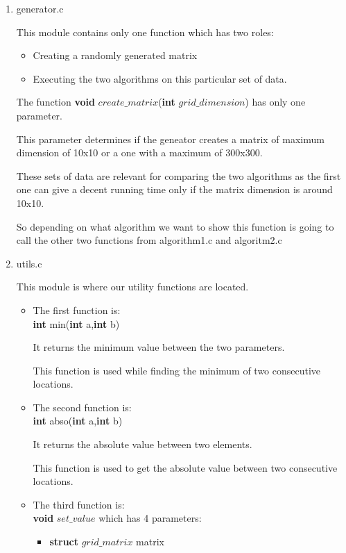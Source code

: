 \documentclass{article}
\begin{document}
\begin{enumerate}
\begin{itemize}
  \end{itemize}
  \newpage
  \item generator.c
  \par This module contains only one function which has two roles:
  \begin{itemize}
      \item Creating a randomly generated matrix
      \item Executing the two algorithms on this particular set of data.
  \end{itemize}
  \par The function \textbf{void} $create\_matrix$(\textbf{int} $grid\_dimension$) has only one parameter. 
  \par This parameter determines if the geneator creates a matrix of maximum dimension of 10x10 or a one with a maximum of 300x300.
  \par These sets of data are relevant for comparing the two algorithms
  as the first one can give a decent running time only if the matrix dimension is around 10x10.
  \par So depending on what algorithm we want to show this function is going to call the other two functions from algorithm1.c and algoritm2.c
  \item utils.c
  \par This module is where our utility functions are located.
  \begin{itemize}
      \item The first function is:
      \\\textbf{int} min(\textbf {int} a,\textbf{int} b)
      \par It returns the minimum value between the two parameters.
      \par This function is used while finding the minimum of two consecutive locations.
      \newpage
      \item The second function is:
      \\\textbf{int} abso(\textbf {int} a,\textbf{int} b)
      \par It returns the absolute value between two elements.
      \par This function is used to get the absolute value between two consecutive locations.
      \item The third function is:
      \\\textbf{void} $set\_value$ which has 4 parameters:
      \begin{itemize}
          \item \textbf{struct} $grid\_matrix$ matrix

\end{itemize}
\end{itemize}
\end{enumerate}
\end{document}
